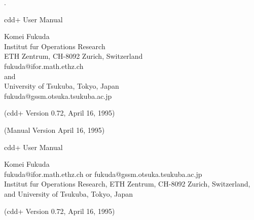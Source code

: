 %
\renewcommand{\baselinestretch}{1.0}
\setlength{\oddsidemargin}{8mm}
\setlength{\textwidth}{16cm}
\setlength{\topmargin}{0mm}
\setlength{\textheight}{23cm}
\setlength{\headsep}{0in}
\setlength{\headheight}{0pt}

\pagestyle{empty}



.\vspace{20mm}

\begin{center}

\vspace{20mm}

{\LARGE cdd+ User Manual}

\vspace{20mm}

{\Large Komei Fukuda\\
   Institut fur Operations Research\\ 
   ETH Zentrum, CH-8092 Zurich, Switzerland\\  
    fukuda@ifor.math.ethz.ch\\
  and\\
   University of Tsukuba, Tokyo, Japan\\
  fukuda@gssm.otsuka.tsukuba.ac.jp
}

\vspace{20mm}
{\Large (cdd+ Version 0.72,  April 16, 1995)}

{\Large (Manual  Version  April 16, 1995)}

\end{center}

\newpage
\pagestyle{plain}
\setcounter{page}{1} 

\begin{center}

{\Large cdd+ User Manual}

\bigskip
{\large Komei Fukuda\\
   fukuda@ifor.math.ethz.ch  or  fukuda@gssm.otsuka.tsukuba.ac.jp\\
    Institut fur Operations Research, 
   ETH Zentrum, CH-8092 Zurich, Switzerland,\\  
   and  University of Tsukuba, Tokyo, Japan}

\bigskip
{\large (cdd+ Version 0.72,  April 16, 1995)}

\end{center}

